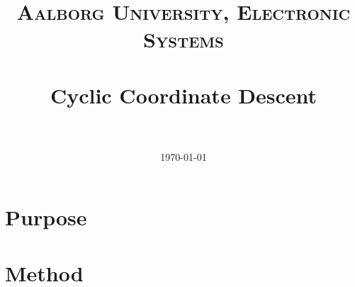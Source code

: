 \documentclass[paper=a4, fontsize=11pt]{scrartcl} %
\title{	
\normalfont \normalsize 
\textsc{Aalborg University, Electronic Systems} \\ [25pt] %
\horrule{0.5pt} \\[0.4cm] %
\huge Cyclic Coordinate Descent \\ %
\horrule{2pt} \\[0.5cm] %
}
\date{\normalsize\today} %
\numberwithin{equation}{section} %
\numberwithin{figure}{section} %
\numberwithin{table}{section} %
\begin{document}
\maketitle %


\section{Purpose}
 

\section{Method}
\end{document}
